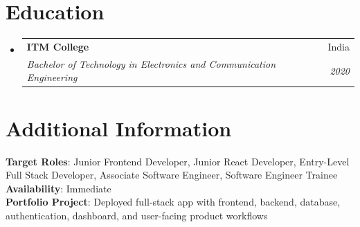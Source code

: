 \documentclass[letterpaper,11pt]{article}
\makeatletter
\newcommand{\resumeSubheading}[4]{
  \vspace{-2pt}\item
    \begin{tabular*}{0.97\textwidth}[t]{l@{\extracolsep{\fill}}r}
      \textbf{#1} & #2 \\
      \textit{\small#3} & \textit{\small #4} \\
    \end{tabular*}\vspace{-7pt}
}
\newcommand{\resumeSubHeadingListStart}{\begin{itemize}[leftmargin=0.15in, label={}]}
\newcommand{\resumeSubHeadingListEnd}{\end{itemize}}
\makeatother
\begin{document}
\section{Education}
\resumeSubHeadingListStart
  \resumeSubheading
    {ITM College}{India}
    {Bachelor of Technology in Electronics and Communication Engineering}{2020}
\resumeSubHeadingListEnd

\section{Additional Information}
\begin{itemize}[leftmargin=0.15in, label={}]
  \small{\item{
    \textbf{Target Roles}{: Junior Frontend Developer, Junior React Developer, Entry-Level Full Stack Developer, Associate Software Engineer, Software Engineer Trainee} \\
    \textbf{Availability}{: Immediate} \\
    \textbf{Portfolio Project}{: Deployed full-stack app with frontend, backend, database, authentication, dashboard, and user-facing product workflows}
  }}
\end{itemize}
\end{document}
